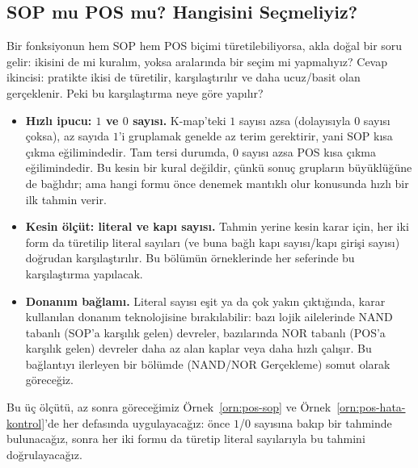 \subsection{SOP mu POS mu? Hangisini Seçmeliyiz?}\label{sec:pos-mi-sop-mu}
Bir fonksiyonun hem SOP hem POS biçimi türetilebiliyorsa, akla doğal bir soru gelir: ikisini
de mi kuralım, yoksa aralarında bir seçim mi yapmalıyız? Cevap ikincisi: pratikte ikisi de
türetilir, karşılaştırılır ve daha ucuz/basit olan gerçeklenir. Peki bu karşılaştırma neye
göre yapılır?

\begin{itemize}[nosep, leftmargin=*]
    \item \textbf{Hızlı ipucu: $1$ ve $0$ sayısı.} K-map'teki $1$ sayısı azsa (dolayısıyla
    $0$ sayısı çoksa), az sayıda $1$'i gruplamak genelde az terim gerektirir, yani SOP kısa
    çıkma eğilimindedir. Tam tersi durumda, $0$ sayısı azsa POS kısa çıkma eğilimindedir.
    Bu kesin bir kural değildir, çünkü sonuç grupların büyüklüğüne de bağlıdır; ama hangi
    formu önce denemek mantıklı olur konusunda hızlı bir ilk tahmin verir.
    \item \textbf{Kesin ölçüt: literal ve kapı sayısı.} Tahmin yerine kesin karar için, her
    iki form da türetilip literal sayıları (ve buna bağlı kapı sayısı/kapı girişi sayısı)
    doğrudan karşılaştırılır. Bu bölümün örneklerinde her seferinde bu karşılaştırma
    yapılacak.
    \item \textbf{Donanım bağlamı.} Literal sayısı eşit ya da çok yakın çıktığında, karar
    kullanılan donanım teknolojisine bırakılabilir: bazı lojik ailelerinde NAND tabanlı
    (SOP'a karşılık gelen) devreler, bazılarında NOR tabanlı (POS'a karşılık gelen) devreler
    daha az alan kaplar veya daha hızlı çalışır. Bu bağlantıyı ilerleyen bir bölümde
    (NAND/NOR Gerçekleme) somut olarak göreceğiz.
\end{itemize}

Bu üç ölçütü, az sonra göreceğimiz Örnek~\ref{orn:pos-sop} ve Örnek~\ref{orn:pos-hata-kontrol}'de
her defasında uygulayacağız: önce $1$/$0$ sayısına bakıp bir tahminde bulunacağız, sonra her
iki formu da türetip literal sayılarıyla bu tahmini doğrulayacağız.

